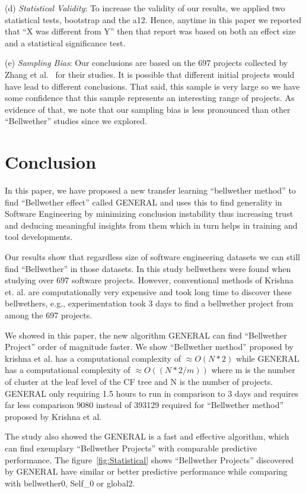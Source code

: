 \documentclass[10pt,journal,compsoc]{IEEEtran}
\begin{document}
(d) \textit{Statistical Validity}: To increase the validity of our results, we applied two statistical tests, bootstrap and the a12. Hence, anytime in this paper we reported that ``X was different from Y'' then that report was based on both an effect size and a statistical significance test.
 
(e) \textit{Sampling Bias}: Our conclusions are based on the 697 projects collected by Zhang et al.~\cite{zhang15} for their studies. It is possible that different initial projects would have lead to different conclusions. That said, this sample is very large so we have some confidence that this sample represents an interesting range of projects. As evidence of that, we note that our sampling bias is less pronounced than other ``Bellwether'' studies since we explored.
 



\section{Conclusion}
\label{sec:concl}
In this paper, we have proposed a new transfer learning ``bellwether method'' to find ``Bellwether effect'' called GENERAL and uses this to find generality in Software Engineering by minimizing conclusion instability thus increasing trust and deducing meaningful insights from them which in turn helps in training and tool developments. 

Our results show that regardless size of software engineering datasets we can still find ``Bellwether'' in those datasets. In this study bellwethers were found when studying over 697 software projects. However, conventional methods of Krishna et. al. are computationally very expensive and took long time to discover these bellwethers, e.g., experimentation took 3 days to find a bellwether project from among the 697 projects.

We showed in this paper, the new algorithm GENERAL can find ``Bellwether Project'' order of magnitude faster. We show ``Bellwether method'' proposed by krishna et al. has a computational complexity of $\approx O(N*2)$ while GENERAL has a computational complexity of $\approx O((N*2/m))$ where m is the number of cluster at the leaf level of the CF tree and N is the number of projects. GENERAL only requiring 1.5 hours to run in comparison to 3 days and requires far less comparison 9080 instead of 393129 required for ``Bellwether method'' proposed by Krishna et al.

The study also showed the GENERAL is a fast and effective algorithm, which can find exemplary ``Bellwether Projects'' with comparable predictive performance. The figure~\ref{fig:Statistical} shows ``Bellwether Projects'' discovered by GENERAL have similar or better predictive performance while comparing with bellwether0, Self\_0 or global2. 
\end{document}
